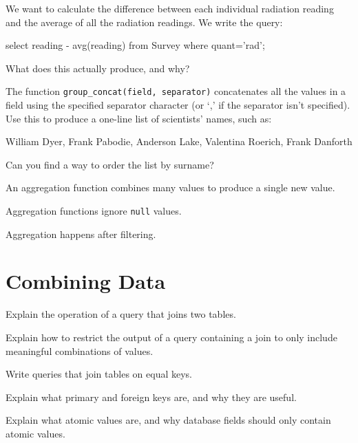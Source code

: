 \documentclass{book}
\begin{document}
\begin{challenge}
  We want to calculate the difference between each individual radiation
  reading and the average of all the radiation readings. We write the
  query:

\begin{VerbIn}
select reading - avg(reading) from Survey where quant='rad';
\end{VerbIn}

  What does this actually produce, and why?
\end{challenge}

\begin{challenge}
  The function \texttt{group\_concat(field, separator)} concatenates all
  the values in a field using the specified separator character (or `,'
  if the separator isn't specified). Use this to produce a one-line list
  of scientists' names, such as:

\begin{VerbIn}
William Dyer, Frank Pabodie, Anderson Lake, Valentina Roerich, Frank Danforth
\end{VerbIn}

  Can you find a way to order the list by surname?
\end{challenge}

\begin{keypoints}
\begin{swcitemize}
\item
  An aggregation function combines many values to produce a single new
  value.
\item
  Aggregation functions ignore \texttt{null} values.
\item
  Aggregation happens after filtering.
\end{swcitemize}
\end{keypoints}

\section{Combining Data}

\begin{objectives}
\begin{swcitemize}
\item
  Explain the operation of a query that joins two tables.
\item
  Explain how to restrict the output of a query containing a join to
  only include meaningful combinations of values.
\item
  Write queries that join tables on equal keys.
\item
  Explain what primary and foreign keys are, and why they are useful.
\item
  Explain what atomic values are, and why database fields should only
  contain atomic values.
\end{swcitemize}
\end{objectives}
\end{document}
